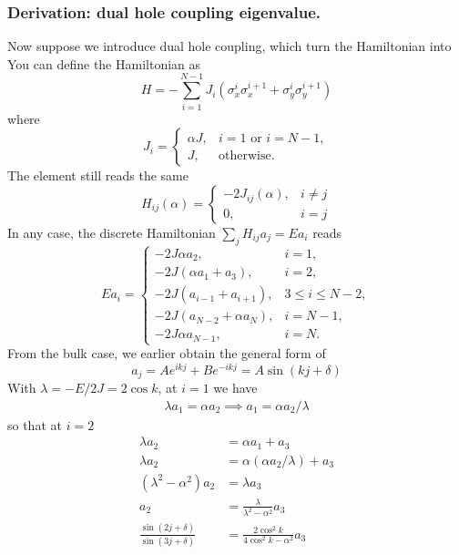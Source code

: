 \documentclass[../../../main.tex]{subfiles}
\begin{document}
\subsubsection{Derivation: dual hole coupling eigenvalue.}
Now suppose we introduce dual hole coupling, which turn the Hamiltonian into
You can define the Hamiltonian as
\begin{equation*}
  H=-\sum_{i=1}^{N-1}J_i\left(\sigma_x^i\sigma_x^{i+1}+\sigma_y^i\sigma_y^{i+1}\right)
\end{equation*}
where
\begin{equation*}
  J_i=
  \begin{cases}
    \alpha J, & i=1 \text{ or } i=N-1, \\
    J,        & \text{otherwise}.
  \end{cases}
\end{equation*}
The element still reads the same
\begin{equation*}
  H_{ij}(\alpha)=
  \begin{cases}
    -2J_{ij}(\alpha), & i \neq j \\
    0,                & i=j
  \end{cases}
\end{equation*}
In any case, the discrete Hamiltonian  $\textstyle\sum_j H_{ij}a_j = E a_i$ reads
\begin{equation*}
  E a_i=
  \begin{cases}
    -2J\alpha a_2,              & i=1,           \\
    -2J(\alpha a_{1}+a_{3}),    & i = 2,         \\
    -2J(a_{i-1}+a_{i+1}),       & 3\le i\le N-2, \\
    -2J( a_{N-2}+\alpha a_{N}), & i = N-1,       \\
    -2J\alpha a_{N-1},          & i=N.
  \end{cases}
\end{equation*}
From the bulk case, we earlier obtain the general form of
\begin{equation*}
  a_j = Ae^{ikj} + B e^{-ikj} = A \sin (kj+\delta)
\end{equation*}
With $\lambda = -E/2J = 2 \cos k$, at $i=1$ we have
\begin{align*}
  \lambda a_1=\alpha a_2\implies a_1  = \alpha a_2/\lambda
\end{align*}
so that at $i=2$
\begin{align*}
  \lambda a_2                                 & = \alpha a_1+a_3                            \\
  \lambda a_2                                 & = \alpha(\alpha a_2/\lambda)+a_3            \\
  (\lambda^2-\alpha^2)a_2                     & = \lambda a_3                               \\
  a_2                                         & = \frac{\lambda}{\lambda^2-\alpha^2}a_3     \\
  \frac{\sin (2j+\delta )}{\sin (3j+\delta )} & = \frac{2\cos ^2 k}{4 \cos ^2k-\alpha^2}a_3
\end{align*}
\end{document}
